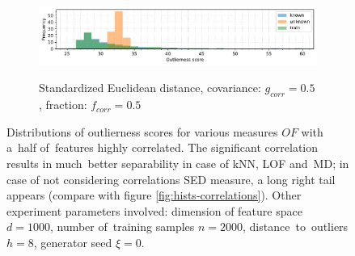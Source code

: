 \begin{figure}[t]
\begin{subfigure}[b]{\textwidth}
        \centering
        \caption{\small Standardized Euclidean distance, covariance: $g_{corr} = 0.5$, fraction: $f_{corr} = 0.5$}
        \includegraphics[width=\textwidth]{images/correlations/hists-extreme/hist-correlations-n_correlated_0.50-covariance_0.50-distance_8-outliers_correlated_False-model_SED-seed_0.pdf}
        \label{fig:hists-correlations-extreme-sed}
    \end{subfigure}
    \caption{Distributions of outlierness scores for various measures $OF$ with a~half of~features highly correlated. The significant correlation results in much~better separability in case of kNN, LOF and~MD; in case of not considering correlations SED measure, a long right tail appears (compare with figure \ref{fig:hists-correlations}). Other experiment parameters involved: dimension of feature space $d = 1000$, number of~training samples $n = 2000$, distance~to~outliers $h = 8$, generator seed $\xi = 0$.}
    \label{fig:hists-correlations-extreme}
\end{figure}

\cleardoublepage{}
